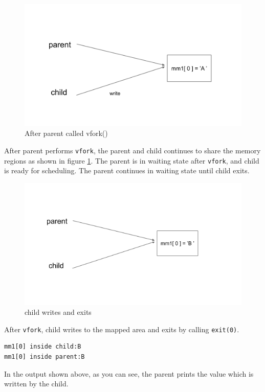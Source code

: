 \documentclass[12pt]{article}
\begin{document}
\begin{figure}[H]
    \centering
    \includegraphics[scale=.5]{vfork.png}
    \caption{After parent called vfork()}
    \label{fig:vfork}
\end{figure}
After parent performs {\tt vfork}, the parent and child continues to share the memory regions as shown in figure \ref{fig:vfork}. The parent is in waiting state after {\tt vfork}, and child is ready for scheduling. The parent continues in waiting state until child exits.

\begin{figure}[H]
    \centering
    \includegraphics[scale=.5]{after_vfork.png}
    \caption{child writes and exits}
    \label{fig:vfork_after_write}
\end{figure}

After {\tt vfork}, child writes to the mapped area and exits by calling {\tt exit(0)}.
\begin{verbatim}
mm1[0] inside child:B
mm1[0] inside parent:B
\end{verbatim}
In the output shown above, as you can see, the parent prints the value which is written by the child.
\end{document}
